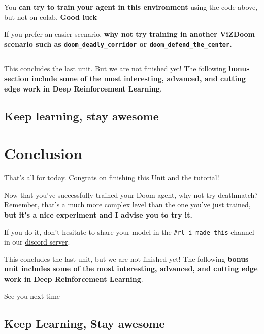 \documentclass[11pt,a4paper]{article}
\begin{document}
You \textbf{can try to train your agent in this environment} using the code above, but not on colab. \textbf{Good luck }

If you prefer an easier scenario, \textbf{why not try training in another ViZDoom scenario such as \texttt{doom\_deadly\_corridor} or \texttt{doom\_defend\_the\_center}.}

\begin{center}\rule{0.5\linewidth}{0.5pt}\end{center}

This concludes the last unit. But we are not finished yet! The following \textbf{bonus section include some of the most interesting, advanced, and cutting edge work in Deep Reinforcement Learning}.

\subsection{Keep learning, stay awesome}\label{keep-learning-stay-awesome-2}

\section{Conclusion}\label{conclusion-1}

That's all for today. Congrats on finishing this Unit and the tutorial!

Now that you've successfully trained your Doom agent, why not try deathmatch? Remember, that's a much more complex level than the one you've just trained, \textbf{but it's a nice experiment and I advise you to try it.}

If you do it, don't hesitate to share your model in the \texttt{\#rl-i-made-this} channel in our \href{https://www.hf.co/join/discord}{discord server}.

This concludes the last unit, but we are not finished yet! The following \textbf{bonus unit includes some of the most interesting, advanced, and cutting edge work in Deep Reinforcement Learning}.

See you next time

\subsection{Keep Learning, Stay awesome}\label{keep-learning-stay-awesome-3}
\end{document}
